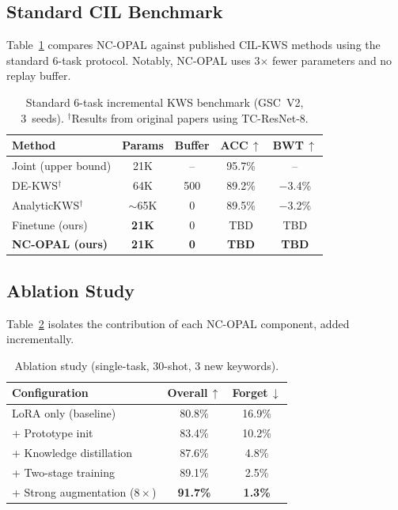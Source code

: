 \documentclass{Interspeech}
\begin{document}
\subsection{Standard CIL Benchmark}

Table~\ref{tab:benchmark} compares NC-OPAL against published CIL-KWS methods using the standard 6-task protocol.
Notably, NC-OPAL uses 3$\times$ fewer parameters and no replay buffer.

\begin{table}[t]
\centering
\caption{Standard 6-task incremental KWS benchmark (GSC~V2, 3~seeds). $^\dagger$Results from original papers using TC-ResNet-8.}
\label{tab:benchmark}
\setlength{\tabcolsep}{3.5pt}
\begin{tabular}{@{}lcccc@{}}
\toprule
Method & Params & Buffer & ACC\,$\uparrow$ & BWT\,$\uparrow$ \\
\midrule
Joint (upper bound)                       & 21K          & --  & 95.7\%          & -- \\
\midrule
DE-KWS$^\dagger$~\cite{peng2024dekws}    & 64K          & 500 & 89.2\%          & $-$3.4\% \\
AnalyticKWS$^\dagger$~\cite{peng2025analytickws} & ${\sim}$65K & 0 & 89.5\%     & $-$3.2\% \\
\midrule
Finetune (ours)                           & \textbf{21K} & 0   & TBD             & TBD \\
\textbf{NC-OPAL (ours)}                  & \textbf{21K} & \textbf{0} & \textbf{TBD} & \textbf{TBD} \\
\bottomrule
\end{tabular}
\end{table}

\subsection{Ablation Study}

Table~\ref{tab:ablation} isolates the contribution of each NC-OPAL component, added incrementally.

\begin{table}[t]
\centering
\caption{Ablation study (single-task, 30-shot, 3 new keywords).}
\label{tab:ablation}
\setlength{\tabcolsep}{5pt}
\begin{tabular}{@{}lcc@{}}
\toprule
Configuration & Overall\,$\uparrow$ & Forget\,$\downarrow$ \\
\midrule
LoRA only (baseline)                   & 80.8\% & 16.9\% \\
\quad + Prototype init                 & 83.4\% & 10.2\% \\
\quad + Knowledge distillation         & 87.6\% &  4.8\% \\
\quad + Two-stage training             & 89.1\% &  2.5\% \\
\quad + Strong augmentation ($8{\times}$) & \textbf{91.7\%} & \textbf{1.3\%} \\
\bottomrule
\end{tabular}
\end{table}
\end{document}
